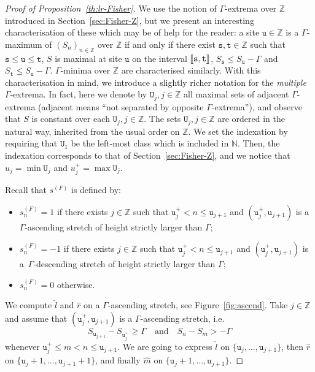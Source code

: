 \documentclass[10pt]{amsart}
\theoremstyle{definition}\newtheorem{defi}[theo]{Definition}\newtheorem{rema}[theo]{Remark}\newtheorem{exam}[theo]{Example}\newtheorem{exem}[theo]{Example}\newtheorem{nota}[theo]{Notation}
\newcommand{\N}{\mathbb{N}}
\newcommand{\bbZ}{\mathbb{Z}}
\newcommand{\gG}{\Gamma}
\renewcommand*\ss{\mathtt{u}}
\newcommand{\ttt}{\mathtt{t}}
\newcommand{\tu}{\ss}
\newcommand{\tU}{\mathtt{U}}
\newcommand{\ts}{\mathtt{s}}
\newcommand{\ls}{\widehat{l}}
\newcommand{\rs}{\widehat{r}}
\newcommand{\ms}{\widehat{m}}
\newcommand{\llbracket}{\mathopen{[\mkern -2.7mu[}}
\newcommand{\rrbracket}{\mathclose{]\mkern -2.7mu]}}
\newcommand{\lbra}{\llbracket}
\newcommand{\rbra}{\rrbracket}
\begin{document}
\begin{proof}[Proof of Proposition~\ref{th:lr-Fisher}]
{We use the notion of $\gG$-extrema over $\bbZ$ introduced in Section~\ref{sec:Fisher-Z}, but we present an interesting characterisation of these which may be of help for the reader: a site $\tu\in\bbZ$ is a $\gG$-maximum of $(S_n)_{n\in\bbZ}$ over $\bbZ$ if and only if there exist $\ts, \ttt\in\bbZ$ such that $\ts\le \tu\le \ttt$, $S$ is maximal at site $\tu$ on the interval $\lbra\ts, \ttt\rbra$, $S_{\ts}\le S_{\tu}-\gG$ and $S_{\ttt}\le S_{\tu}-\gG$. $\gG$-minima over $\bbZ$ are characterised similarly. With this characterisation in mind, we introduce a slightly richer notation for the \emph{multiple} $\gG$-extrema.} In fact, here we denote by $\tU_j, j\in\bbZ$ all maximal sets of adjacent $\gG$-extrema (adjacent means ``not separated by opposite $\gG$-extrema''), and observe that $S$ is constant over each $\tU_j, j\in\bbZ$. The sets $\tU_j, j\in\bbZ$ are ordered in the natural way, inherited from the usual order on $\bbZ$. We set the indexation by requiring that $\tU_1$ be the left-most class which is included in $\N$. Then, the indexation corresponds to that of Section~\ref{sec:Fisher-Z}, and we notice that $u_j=\min \tU_j$ and $u_j^+=\max \tU_j$.

\pagebreak
Recall that $s^{(F)}$ is defined by:
\begin{itemize}
\item $s^{(F)}_n=1$ if there exists $j\in\bbZ$ such that $\tu_j^+< n\le \tu_{j+1}$ and $(\tu_j^+, \tu_{j+1})$ is a~$\gG$-ascending stretch of height strictly larger than $\gG$;
\item $s^{(F)}_n=-1$ if there exists $j\in\bbZ$ such that $\tu_j^+< n\le \tu_{j+1}$ and $(\tu_j^+, \tu_{j+1})$ is a~$\gG$-descending stretch of height strictly larger than $\gG$;
\item $s^{(F)}_n=0$ otherwise.
\end{itemize}

We compute $\ls$ and $\rs$ on a $\gG$-ascending stretch, see Figure~\ref{fig:ascend}. Take $j\in\bbZ$ and assume that $(\tu_j^+, \tu_{j+1})$ is a $\gG$-ascending stretch, i.e.
\[
S_{\tu_{j+1}}-S_{\tu_j^+}\ge \gG\quad\text{and} \quad S_n-S_m> -\gG
\]
whenever $\tu_j^+\le m<n\le \tu_{j+1}$. We are going to express $\ls$ on $\{\tu_j, \dots, \tu_{j+1}\}$, then $\rs$ on $\{\tu_j+1, \dots, \tu_{j+1}+1\}$, and finally $\ms$ on $\{\tu_j+1, \dots, \tu_{j+1}\}$.


\end{proof}
\end{document}
